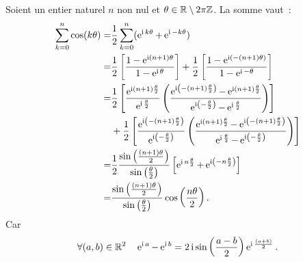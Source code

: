 Soient un entier naturel $n$ non nul et $\theta \in \mathbb{R} \setminus 2\pi\mathbb{Z}$. La somme vaut~:
\begin{align}
  \sum_{k=0}^n \cos(k\theta) =& \frac{1}{2} \sum_{k=0}^n (\operatorname{e}^{\operatorname{i} k \theta} + \operatorname{e}^{\operatorname{i} -k \theta})\\
  =&\frac{1}{2} \left[\frac{1-\operatorname{e}^{\operatorname{i} (n+1)\theta}}{1-\operatorname{e}^{\operatorname{i} \theta}}\right] + \frac{1}{2} \left[\frac{1-\operatorname{e}^{\operatorname{i} (-(n+1) \theta)}}{1-\operatorname{e}^{\operatorname{i} -\theta}}\right]\\
  =&\frac{1}{2} \left[\frac{\operatorname{e}^{\operatorname{i} (n+1) \frac{\theta}{2}}}{\operatorname{e}^{\operatorname{i} \frac{\theta}{2}}} \left(\frac{\operatorname{e}^{\operatorname{i} \left(-(n+1) \frac{\theta}{2}\right)}-\operatorname{e}^{\operatorname{i} (n+1) \frac{\theta}{2}}}{\operatorname{e}^{\operatorname{i} \left(-\frac{\theta}{2}\right)} - \operatorname{e}^{\operatorname{i} \frac{\theta}{2}}} \right)\right] \notag \\
  &+ \frac{1}{2} \left[\frac{\operatorname{e}^{\operatorname{i} \left(-(n+1) \frac{\theta}{2}\right)}}{\operatorname{e}^{\operatorname{i} \left(-\frac{\theta}{2}\right)}} \left(\frac{\operatorname{e}^{\operatorname{i} (n+1) \frac{\theta}{2}}-\operatorname{e}^{\operatorname{i} \left(-(n+1) \frac{\theta}{2}\right)}}{\operatorname{e}^{\operatorname{i} \frac{\theta}{2}} - \operatorname{e}^{\operatorname{i} \left(-\frac{\theta}{2}\right)}} \right)\right] \\
  =& \frac{1}{2} \frac{\sin \left(\frac{(n+1)\theta}{2} \right)}{\sin \left( \frac{\theta}{2} \right)} \left[\operatorname{e}^{\operatorname{i} n \frac{\theta}{2}} +\operatorname{e}^{\operatorname{i} \left(-n \frac{\theta}{2}\right)} \right] \\
  =& \frac{\sin \left(\frac{(n+1)\theta}{2} \right)}{\sin \left( \frac{\theta}{2} \right)} \cos \left( \frac{n\theta}{2} \right).
\end{align}
%
Car
\begin{equation}
  \forall (a,b) \in \mathbb{R}^2 \quad \operatorname{e}^{\operatorname{i} a}-\operatorname{e}^{\operatorname{i} b}=2\operatorname{i} \sin\left(\frac{a-b}{2}\right)\operatorname{e}^{\operatorname{i} \frac{(a+b)}{2}}.
\end{equation}

